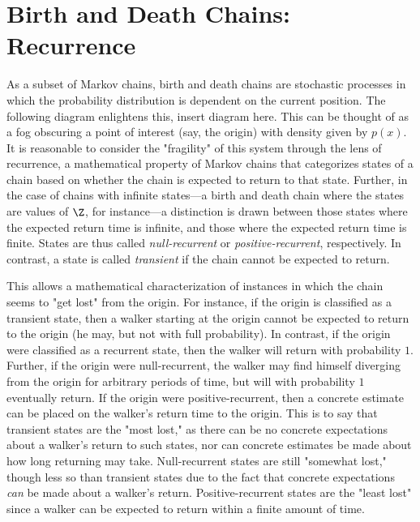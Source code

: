 \section{Birth and Death Chains: Recurrence}
As a subset of Markov chains, birth and death chains are stochastic processes in which the probability
distribution is dependent on the current position. The following diagram enlightens this, insert diagram
here. This can be thought of as a fog obscuring a point of interest (say, the origin) with density given
by $p(x)$. It is reasonable to consider the "fragility" of this system through the lens of recurrence, a
mathematical property of Markov chains that categorizes states of a chain based on whether the chain is
expected to return to that state. Further, in the case of chains with infinite states---a birth and
death chain where the states are values of $\Z$, for instance---a distinction is drawn between those
states where the expected return time is infinite, and those where the expected return time is finite.
States are thus called \emph{null-recurrent} or \emph{positive-recurrent}, respectively. In contrast, a
state is called \emph{transient} if the chain cannot be expected to return.

This allows a mathematical characterization of instances in which the chain seems to "get lost" from the
origin. For instance, if the origin is classified as a transient state, then a walker starting at the
origin cannot be expected to return to the origin (he may, but not with full probability). In contrast,
if the origin were classified as a recurrent state, then the walker will return with probability $1$.
Further, if the origin were null-recurrent, the walker may find himself diverging from the origin for
arbitrary periods of time, but will with probability $1$ eventually return. If the origin were
positive-recurrent, then a concrete estimate can be placed on the walker's return time to the origin.
This is to say that transient states are the "most lost," as there can be no concrete expectations about
a walker's return to such states, nor can concrete estimates be made about how long returning may take.
Null-recurrent states are still "somewhat lost," though less so than transient states due to the fact
that concrete expectations \emph{can} be made about a walker's return. Positive-recurrent states are the
"least lost" since a walker can be expected to return within a finite amount of time.

